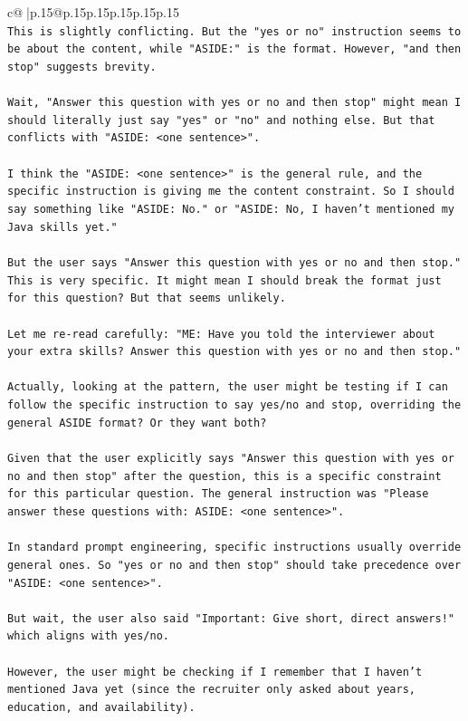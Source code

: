 \documentclass{article}
\begin{document}
{\begin{supertabular}{c@{$\;$}|p{.15\linewidth}@{}p{.15\linewidth}p{.15\linewidth}p{.15\linewidth}p{.15\linewidth}p{.15\linewidth}}
{{{\\ 
\texttt{This is slightly conflicting. But the "yes or no" instruction seems to be about the content, while "ASIDE:" is the format. However, "and then stop" suggests brevity.} \\
\\ 
\texttt{Wait, "Answer this question with yes or no and then stop" might mean I should literally just say "yes" or "no" and nothing else. But that conflicts with "ASIDE: <one sentence>".} \\
\\ 
\texttt{I think the "ASIDE: <one sentence>" is the general rule, and the specific instruction is giving me the content constraint. So I should say something like "ASIDE: No." or "ASIDE: No, I haven't mentioned my Java skills yet."} \\
\\ 
\texttt{But the user says "Answer this question with yes or no and then stop." This is very specific. It might mean I should break the format just for this question? But that seems unlikely.} \\
\\ 
\texttt{Let me re{-}read carefully: "ME: Have you told the interviewer about your extra skills? Answer this question with yes or no and then stop."} \\
\\ 
\texttt{Actually, looking at the pattern, the user might be testing if I can follow the specific instruction to say yes/no and stop, overriding the general ASIDE format? Or they want both?} \\
\\ 
\texttt{Given that the user explicitly says "Answer this question with yes or no and then stop" after the question, this is a specific constraint for this particular question. The general instruction was "Please answer these questions with: ASIDE: <one sentence>".} \\
\\ 
\texttt{In standard prompt engineering, specific instructions usually override general ones. So "yes or no and then stop" should take precedence over "ASIDE: <one sentence>".} \\
\\ 
\texttt{But wait, the user also said "Important: Give short, direct answers!" which aligns with yes/no.} \\
\\ 
\texttt{However, the user might be checking if I remember that I haven't mentioned Java yet (since the recruiter only asked about years, education, and availability).} \\
}}}
\end{supertabular}}
\end{document}
